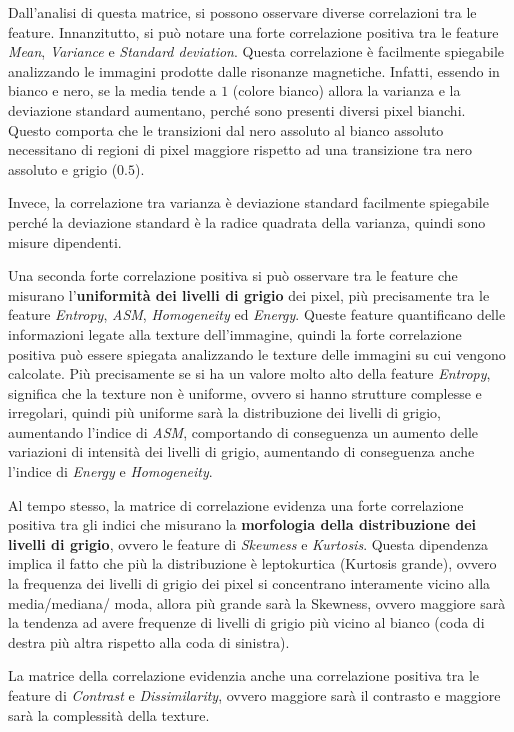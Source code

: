 Dall'analisi di questa matrice, si possono osservare diverse correlazioni tra le
feature. Innanzitutto, si può notare una forte correlazione positiva tra le feature
\textit{Mean}, \textit{Variance} e \textit{Standard deviation}. Questa correlazione
è facilmente spiegabile analizzando le immagini prodotte dalle risonanze magnetiche.
Infatti, essendo in bianco e nero, se la media tende a $1$ (colore bianco) allora
la varianza e la deviazione standard aumentano, perché sono presenti diversi
pixel bianchi. Questo comporta che le transizioni dal nero assoluto al bianco
assoluto necessitano di regioni di pixel maggiore rispetto ad una transizione
tra nero assoluto e grigio ($0.5$).

Invece, la correlazione tra varianza è deviazione standard facilmente spiegabile
perché la deviazione standard è la radice quadrata della varianza, quindi sono 
misure dipendenti.

Una seconda forte correlazione positiva si può osservare tra le feature che
misurano l'\textbf{uniformità dei livelli di grigio} dei pixel, più precisamente
tra le feature \textit{Entropy}, \textit{ASM}, \textit{Homogeneity} ed
\textit{Energy}. Queste feature quantificano delle informazioni legate alla
texture dell'immagine, quindi la forte correlazione positiva può essere spiegata
analizzando le texture delle immagini su cui vengono calcolate. Più precisamente
se si ha un valore molto alto della feature \textit{Entropy}, significa che la
texture non è uniforme, ovvero si hanno strutture complesse e irregolari, quindi
più uniforme sarà la distribuzione dei livelli di grigio, aumentando l'indice
di \textit{ASM}, comportando di conseguenza un aumento delle variazioni di intensità
dei livelli di grigio, aumentando di conseguenza anche l'indice di \textit{Energy}
e \textit{Homogeneity}. 

Al tempo stesso, la matrice di correlazione evidenza una forte correlazione positiva
tra gli indici che misurano la \textbf{morfologia della distribuzione dei livelli di grigio},
ovvero le feature di \textit{Skewness} e \textit{Kurtosis}. Questa dipendenza implica il
fatto che più la distribuzione è leptokurtica (Kurtosis grande), ovvero la frequenza
dei livelli di grigio dei pixel si concentrano interamente vicino alla media/mediana/
moda, allora più grande sarà la Skewness, ovvero maggiore sarà la tendenza ad avere
frequenze di livelli di grigio più vicino al bianco (coda di destra più altra rispetto
alla coda di sinistra).

La matrice della correlazione evidenzia anche una correlazione positiva tra le
feature di \textit{Contrast} e \textit{Dissimilarity}, ovvero maggiore sarà il
contrasto e maggiore sarà la complessità della texture.

